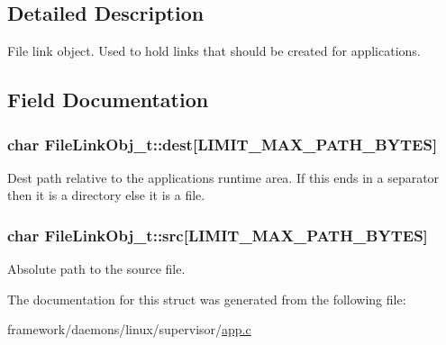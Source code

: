 \subsection{Detailed Description}
File link object. Used to hold links that should be created for applications. 

\subsection{Field Documentation}
\subsubsection[{\texorpdfstring{dest}{dest}}]{\setlength{\rightskip}{0pt plus 5cm}char File\+Link\+Obj\+\_\+t\+::dest\mbox{[}{\bf L\+I\+M\+I\+T\+\_\+\+M\+A\+X\+\_\+\+P\+A\+T\+H\+\_\+\+B\+Y\+T\+ES}\mbox{]}}\hypertarget{struct_file_link_obj__t_a53bd7a777236c5bdb8240930aa28ebaf}{}\label{struct_file_link_obj__t_a53bd7a777236c5bdb8240930aa28ebaf}
Dest path relative to the application\textquotesingle{}s runtime area. If this ends in a separator then it is a directory else it is a file. 
\subsubsection[{\texorpdfstring{src}{src}}]{\setlength{\rightskip}{0pt plus 5cm}char File\+Link\+Obj\+\_\+t\+::src\mbox{[}{\bf L\+I\+M\+I\+T\+\_\+\+M\+A\+X\+\_\+\+P\+A\+T\+H\+\_\+\+B\+Y\+T\+ES}\mbox{]}}\hypertarget{struct_file_link_obj__t_a01ff71979d6cc844716fe62688befc2f}{}\label{struct_file_link_obj__t_a01ff71979d6cc844716fe62688befc2f}


Absolute path to the source file. 



The documentation for this struct was generated from the following file\+:\begin{DoxyCompactItemize}
\item 
framework/daemons/linux/supervisor/\hyperlink{supervisor_2app_8c}{app.\+c}\end{DoxyCompactItemize}
